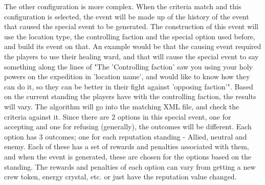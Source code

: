 The other configuration is more complex. When the criteria match and this configuration is selected, the event will be made up of the history of the event that caused the special event to be generated. The construction of this event will use the location type, the controlling faction and the special option used before, and build its event on that. An example would be that the causing event required the players to use their healing ward, and that will cause the special event to say something along the lines of "The 'Controlling faction' saw you using your holy powers on the expedition in 'location name', and would like to know how they can do it, so they can be better in their fight against 'opposing faction'". 
Based on the current standing the players have with the controlling faction, the results will vary. The algorithm will go into the matching XML file, and check the criteria against it. Since there are 2 options in this special event, one for accepting and one for refusing (generally), the outcomes will be different. Each option has 3 outcomes; one for each reputation standing - Allied, neutral and enemy. Each of these has a set of rewards and penalties associated with them, and when the event is generated, these are chosen for the options based on the standing. The rewards and penalties of each option can vary from getting a new crew token, energy crystal, etc. or just have the reputation value changed.


